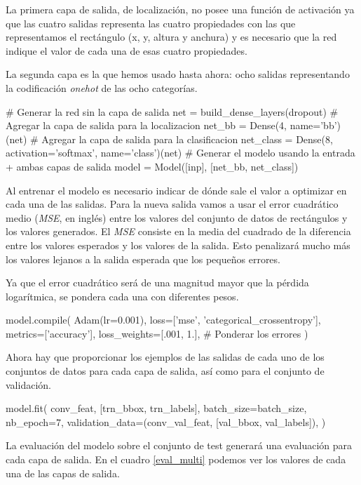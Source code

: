 La primera capa de salida, de localización, no posee una función de activación
ya que las cuatro salidas representa las cuatro propiedades con las que
representamos el rectángulo (x, y, altura y anchura) y es necesario que la red
indique el valor de cada una de esas cuatro propiedades.

La segunda capa es la que hemos usado hasta ahora: ocho salidas representando la
codificación \textit{onehot} de las ocho categorías.
\begin{python}
# Generar la red sin la capa de salida 
net = build_dense_layers(dropout)
# Agregar la capa de salida para la localizacion
net_bb = Dense(4, name='bb')(net)
# Agregar la capa de salida para la clasificacion
net_class = Dense(8, activation='softmax', name='class')(net)
# Generar el modelo usando la entrada + ambas capas de salida
model = Model([inp], [net_bb, net_class])
\end{python}

Al entrenar el modelo es necesario indicar de dónde sale el valor a optimizar
en cada una de las salidas. Para la nueva salida vamos a usar el error
cuadrático medio (\textit{MSE}, en inglés) entre los valores del conjunto de
datos de rectángulos y los valores generados. El \textit{MSE} consiste en la
media del cuadrado de la diferencia entre los valores esperados y los valores
de la salida. Esto penalizará mucho más los valores lejanos a la salida
esperada que los pequeños errores.

Ya que el error cuadrático será de una magnitud mayor que la pérdida logarítmica,
se pondera cada una con diferentes pesos.

\begin{python}
model.compile(
    Adam(lr=0.001),
    loss=['mse', 'categorical_crossentropy'],
    metrics=['accuracy'],
    loss_weights=[.001, 1.],  # Ponderar los errores
)
\end{python}

Ahora hay que proporcionar los ejemplos de las salidas de cada uno de los
conjuntos de datos para cada capa de salida, así como para el conjunto de
validación.

\begin{python}
model.fit(
    conv_feat,
    [trn_bbox, trn_labels],
    batch_size=batch_size,
    nb_epoch=7,
    validation_data=(conv_val_feat, [val_bbox, val_labels]),
)
\end{python}

La evaluación del modelo sobre el conjunto de test generará una evaluación para
cada capa de salida. En el cuadro \ref{eval_multi} podemos ver los valores de
cada una de las capas de salida.

